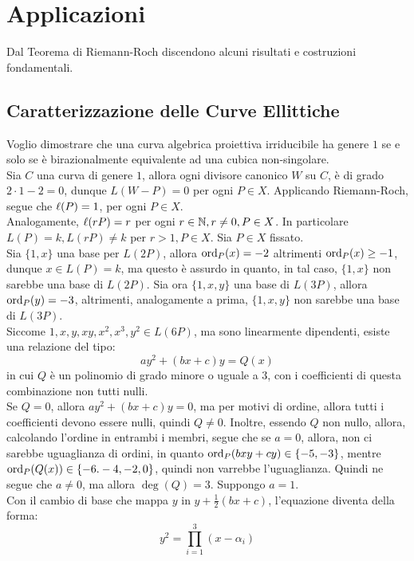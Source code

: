 \chapter{Applicazioni}
    Dal Teorema di Riemann-Roch discendono alcuni risultati e costruzioni fondamentali. 
    \section{Caratterizzazione delle Curve Ellittiche}
        Voglio dimostrare che una curva algebrica proiettiva irriducibile ha genere $1$ se e solo se 
        è birazionalmente equivalente ad una cubica non-singolare.\\
        Sia $C$ una curva di genere $1$, allora ogni divisore canonico $W$ su $C$, è di grado $2\cdot 1 - 2 = 0$, 
        dunque $L(W-P) = 0$ per ogni $P \in X$. Applicando Riemann-Roch, segue che $\ell(P) = 1$, per ogni $P \in X$.\\
        Analogamente, $\ell(rP) = r$ per ogni $r \in \mathbb{N}, r \neq 0, P \in X$. In particolare $L(P) = k, L(rP) \neq k$ per $r > 1, 
        P \in X$. Sia $P \in X$ fissato.\\
        Sia $\{1,x\}$ una base per $L(2P)$, allora $\text{ord}_P(x) = -2$ altrimenti $\text{ord}_P(x) \geq -1$, dunque $x \in L(P) = k$, ma questo è 
        assurdo in quanto, in tal caso, $\{1,x\}$ non sarebbe una base di $L(2P)$. Sia ora $\{1,x,y\}$ una base di $L(3P)$, allora 
        $\text{ord}_P(y) = -3$, altrimenti, analogamente a prima, $\{1,x,y\}$ non sarebbe una base di $L(3P)$. \\
        Siccome $1,x,y,xy,x^2,x^3,y^2 \in L(6P)$, ma sono linearmente dipendenti, esiste una relazione del tipo: $$ay^2 + (bx+c)y = Q(x)$$ 
        in cui $Q$ è un polinomio di grado minore o uguale a $3$, con i coefficienti di questa combinazione non tutti nulli. \\
        Se $Q = 0$, allora $ay^2 + (bx+c)y = 0$, ma per motivi di ordine, allora tutti i coefficienti devono essere nulli, quindi $Q \neq 0$. 
        Inoltre, essendo $Q$ non nullo, allora, calcolando l'ordine in entrambi i membri, segue che se $a = 0$, allora, non ci sarebbe uguaglianza 
        di ordini, in quanto $\text{ord}_P(bxy + cy) \in \{-5,-3\}$, mentre $\text{ord}_P(Q(x)) \in \{-6.-4,-2,0\}$, quindi non varrebbe l'uguaglianza. Quindi 
        ne segue che $a \neq 0$, ma allora $\deg(Q) = 3$. Suppongo $a = 1$.\\
        Con il cambio di base che mappa $y$ in $y + \frac{1}{2}(bx+c)$, l'equazione diventa della forma: $$y^2 = \prod_{i = 1}^3 (x-\alpha_i)$$
